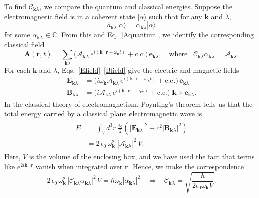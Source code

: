 \documentclass[prx,12pt]{revtex4-2}
\begin{document}
To find $\mathcal{C}_{\mathbf{k}\lambda}$, we compare the quantum and
classical energies.  Suppose the electromagnetic field is in a
coherent state $|\alpha\rangle$ such that for any $\mathbf{k}$ and
$\lambda$,
\begin{equation}
  \hat{a}_{\mathbf{k}\lambda}|\alpha\rangle
  = \alpha_{\mathbf{k}\lambda}|\alpha\rangle
  \label{coherent}
\end{equation}
for some $\alpha_{\mathbf{k}\lambda} \in \mathbb{C}$.  From this and
Eq.~\eqref{Aquantum}, we identify the corresponding classical field
\begin{equation}
  \mathbf{A}(\mathbf{r},t) = \sum_{\mathbf{k}\lambda} 
    \Big(\mathcal{A}_{\mathbf{k}\lambda}\,
    e^{i(\mathbf{k}\cdot\mathbf{r} - \omega_{\mathbf{k}} t)}
    + \mathrm{c.c.}\Big)\, \mathbf{e}_{\mathbf{k}\lambda},
    \quad \mathrm{where}\;\;\;
    \mathcal{C}_{\mathbf{k}\lambda} \alpha_{\mathbf{k}\lambda}
    = \mathcal{A}_{\mathbf{k}\lambda}.
\end{equation}
For each $\mathbf{k}$ and $\lambda$,
Eqs.~\eqref{Efield}--\eqref{Bfield} give the electric and magnetic
fields
\begin{align}
  \mathbf{E}_{\mathbf{k}\lambda}  &=
  \Big(i\omega_{\mathbf{k}} \mathcal{A}_{\mathbf{k}\lambda}\,
    e^{i(\mathbf{k}\cdot\mathbf{r} - \omega_{\mathbf{k}} t)}
    + \mathrm{c.c.}\Big)\, \mathbf{e}_{\mathbf{k}\lambda} \\
    \mathbf{B}_{\mathbf{k}\lambda} &=
    \Big(i \mathcal{A}_{\mathbf{k}\lambda}\,
    e^{i(\mathbf{k}\cdot\mathbf{r} - \omega_{\mathbf{k}} t)}
    + \mathrm{c.c.}\Big) \; \mathbf{k} \times \mathbf{e}_{\mathbf{k}\lambda}.
\end{align}
In the classical theory of electromagnetism, Poynting's theorem tells
us that the total energy carried by a classical plane electromagnetic
wave is
\begin{align}
  \begin{aligned}
  E &= \int_V d^3\!r\; \frac{\epsilon_0}{2} \left(
  \big|\mathbf{E}_{\mathbf{k}\lambda}\big|^2
  + c^2 \big|\mathbf{B}_{\mathbf{k}\lambda}\big|^2 \right) \\
  &= 2 \, \epsilon_0\, \omega_{\mathbf{k}}^2 \;
  |\mathcal{A}_{\mathbf{k}\lambda}|^2 \,V.
  \end{aligned}
\end{align}
Here, $V$ is the volume of the enclosing box, and we have used the
fact that terms like $e^{2i\mathbf{k}\cdot\mathbf{r}}$ vanish when
integrated over $\mathbf{r}$.  Hence, we make the correspondence
\begin{equation}
  2\,\epsilon_0\, \omega_{\mathbf{k}}^2 \,
  |\mathcal{C}_{\mathbf{k}\lambda}\alpha_{\mathbf{k}\lambda}|^2 \, V
  = \hbar \omega_{\mathbf{k}} |\alpha_{\mathbf{k}\lambda}|^2 \quad
  \Rightarrow\;\;\; \mathcal{C}_{\mathbf{k}\lambda} =
  \sqrt{\frac{\hbar}{2\epsilon_0\omega_{\mathbf{k}}V}}.
\end{equation}
\end{document}
